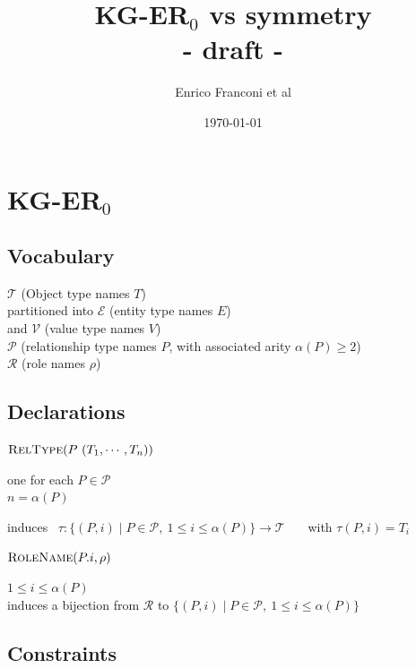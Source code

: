 \documentclass[10pt]{article}
\title{\vspace{-4ex}KG-ER$_0$ vs symmetry\\ - draft -}
\author{Enrico Franconi et al}
\date{\today}
\begin{document}
\maketitle



\section{KG-ER$_0$ %
}


\subsection*{Vocabulary}
$\mathcal{T}$ (Object type names $T$) \\
\phantom{}\hspace{1em}
partitioned into $\mathcal{E}$ (entity type names $E$) \\
\phantom{}\hspace{1em}
and $\mathcal{V}$ (value type names $V$)\\
$\mathcal{P}$ (relationship type names $P$, with associated arity $\alpha(P)\geq 2$)\\
$\mathcal{R}$ (role names $\rho$)

\noindent


\subsection*{Declarations}

\noindent
$\textsc{RelType}(P\ (T_1, \cdots , T_n))$ 
~~~~~{ 
\parbox[t]{\textwidth}{%
one for each $P\in\mathcal{P}$\\
$n=\alpha(P)$\\
\parbox[t]{\textwidth}{%
induces~ 
$\tau:\{(P,i)\mid P\in\mathcal P,\ 1\leq i\leq\alpha(P)\}\to\mathcal T$ ~~~with $\tau(P,i)=T_i$}}}

\noindent
$\textsc{RoleName}(P.i, \rho)$ 
~~~~~~~~~~~~~~~~~~~~~~~~~~{ 
\parbox[t]{\textwidth}{%
$1\leq i\leq \alpha(P)$\\
induces a bijection from $\mathcal{R}$ to 
$\displaystyle\{(P,i)\mid P\in\mathcal P,\ 1\leq i\leq\alpha(P)\}$
}}


\subsection*{Constraints}
\end{document}
